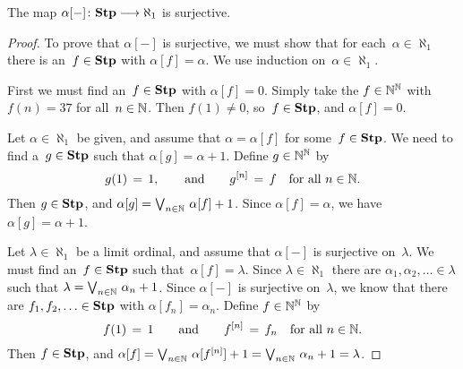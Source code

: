 \begin{lem}
The map $\alpha[-]\colon \mathbf{Stp}\longrightarrow \aleph_1$ is surjective.
\end{lem}
\begin{proof}
To prove that $\alpha[-]$ is surjective,
we must 
show that
for each~$\alpha\in\aleph_1$
there is an~$f\in \mathbf{Stp}$ with $\alpha[f]=\alpha$.
We use induction on~$\alpha\in\aleph_1$.

First we must find an~$f\in\mathbf{Stp}$
with $\alpha[f]=0$.
Simply take the $f \in \mathbb{N}^{\mathbb{N}}$
with $f(n)=37$ for all~$n\in \mathbb{N}$.
Then $f(1)\neq 0$, so~$f\in\mathbf{Stp}$, and $\alpha[f]=0$.

Let $\alpha\in \aleph_1$
be given, 
and assume that $\alpha = \alpha[f]$
for some~$f\in\mathbf{Stp}$.
We need to find a~$g\in \mathbf{Stp}$
such that $\alpha[g]=\alpha+1$.
Define $g\in\mathbb{N}^{\mathbb{N}}$ by 
\begin{equation*}
g(1)\,=\,1,\qquad\text{and}\qquad
g^{[n]}\,=\, f\quad\text{for all~$n\in\mathbb{N}$}.
\end{equation*}
Then $g\in\mathbf{Stp}$, and $\alpha[g]=\textstyle{\bigvee}_{n\in\mathbb{N}} \ \alpha[f]+1$.
Since $\alpha[f]=\alpha$, we have $\alpha[g]=\alpha+1$.

Let $\lambda\in\aleph_1$
be a limit ordinal,
and assume that $\alpha[-]$ is surjective on~$\lambda$.
We must find an~$f\in \mathbf{Stp}$ such that~$\alpha[f]=\lambda$.
Since $\lambda\in\aleph_1$
there are  $\alpha_1 ,\alpha_2 ,\dotsc \in \lambda$
such that $\lambda = \bv_{n\in\N}\ \alpha_n+1$.
Since $\alpha[-]$
is surjective on~$\lambda$,
we know that there are  $f_1,f_2,\dotsc \in \mathbf{Stp}$
with $\alpha[f_n] = \alpha_n$.
Define $f\in\mathbb{N}^{\mathbb{N}}$ by 
\begin{equation*}
f(1)\,=\,1\qquad\text{and}\qquad
f^{[n]} \,=\, f_n\quad\text{for all $n\in\mathbb{N}$}.
\end{equation*}
Then $f\in\mathbf{Stp}$,
and $\alpha[f] = \textstyle{\bigvee}_{n\in\mathbb{N}}\  \alpha[f^{[n]}]+1 
= \textstyle{\bigvee}_{n\in\mathbb{N}}\ \alpha_n +1 = \lambda$.
\end{proof}

